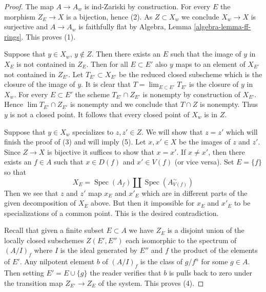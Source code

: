 \documentclass[10pt,a4paper]{amsart}
\theoremstyle{plain}
\theoremstyle{definition}
\theoremstyle{remark}
\numberwithin{equation}{subsection}
\def\lim{\mathop{\mathrm{lim}}\nolimits}
\def\Spec{\mathop{\mathrm{Spec}}}
\begin{document}
\begin{proof}
The map $A \to A_w$ is ind-Zariski by construction.
For every $E$ the morphism $Z_E \to X$ is a bijection, hence (2).
As $Z \subset X_w$ we conclude $X_w \to X$ is surjective and
$A \to A_w$ is faithfully flat by
Algebra, Lemma \ref{algebra-lemma-ff-rings}. This proves (1).

\medskip\noindent
Suppose that $y \in X_w$, $y \not \in Z$. Then there
exists an $E$ such that the image of $y$ in $X_E$ is not contained in
$Z_E$. Then for all $E \subset E'$ also $y$ maps to an element of $X_{E'}$
not contained in $Z_{E'}$. Let $T_{E'} \subset X_{E'}$ be the reduced
closed subscheme which is the closure of the image of $y$. It is
clear that $T = \lim_{E \subset E'} T_{E'}$ is the closure of $y$ in $X_w$.
For every $E \subset E'$ the scheme $T_{E'} \cap Z_{E'}$ is nonempty
by construction of $X_{E'}$. Hence $\lim T_{E'} \cap Z_{E'}$ is nonempty
and we conclude that $T \cap Z$ is nonempty. Thus $y$ is not a closed point.
It follows that every closed point of $X_w$ is in $Z$.

\medskip\noindent
Suppose that $y \in X_w$ specializes to $z, z' \in Z$. We will show that
$z = z'$ which will finish the proof of (3) and will imply (5).
Let $x, x' \in X$ be the images of $z$ and $z'$. Since $Z \to X$ is
bijective it suffices to show that $x = x'$. If $x \not = x'$, then
there exists an $f \in A$ such that $x \in D(f)$ and $x' \in V(f)$
(or vice versa). Set $E = \{f\}$ so that
$$
X_E = \Spec(A_f) \amalg \Spec(A_{V(f)}^\sim)
$$
Then we see that $z$ and $z'$ map $x_E$ and $x'_E$ which are in different
parts of the given decomposition of $X_E$ above. But then it impossible
for $x_E$ and $x'_E$ to be specializations of a common point.
This is the desired contradiction.

\medskip\noindent
Recall that given a finite subset $E \subset A$ we have $Z_E$
is a disjoint union of the locally closed subschemes $Z(E', E'')$
each isomorphic to the spectrum of $(A/I)_f$ where $I$ is the ideal
generated by $E''$ and $f$ the product of the elements of $E'$.
Any nilpotent element $b$ of $(A/I)_f$ is the class of $g/f^n$
for some $g \in A$. Then setting $E' = E \cup \{g\}$ the reader
verifies that $b$ is pulls back to zero under the transition map
$Z_{E'} \to Z_E$ of the system. This proves (4).
\end{proof}
\end{document}
